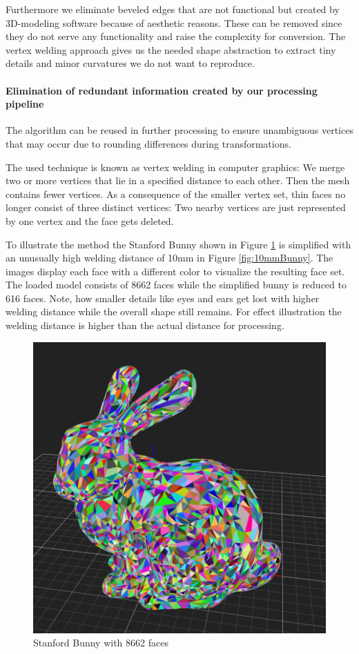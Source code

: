 \documentclass[../ClassicThesis.tex]{subfiles}
\begin{document}
Furthermore we eliminate beveled edges that are not functional but created by 3D-modeling software because of aesthetic reasons. These can be removed since they do not serve any functionality and raise the complexity for conversion. The vertex welding approach gives us the needed shape abstraction to extract tiny details and minor curvatures we do not want to reproduce.

\paragraph*{Elimination of redundant information created by our processing pipeline}

The algorithm can be reused in further processing to ensure unambiguous vertices that may occur due to rounding differences during transformations.


The used technique is known as vertex welding in computer graphics: We merge two or more vertices that lie in a specified distance to each other. Then the mesh contains fewer vertices. As a consequence of the smaller vertex set, thin faces no longer consist of three distinct vertices: Two nearby vertices are just represented by one vertex and the face gets deleted.

To illustrate the method the {\threedmodel} Stanford Bunny shown in Figure \ref{fig:origBunny} is simplified with an unusually high welding distance of 10mm in Figure \ref{fig:10mmBunny}. The images display each face with a different color to visualize the resulting face set. The loaded model consists of 8662 faces while the simplified bunny is reduced to 616 faces. Note, how smaller details like eyes and ears get lost with higher welding distance while the overall shape still remains. For effect illustration the welding distance is higher than the actual distance for processing.

\begin{figure}
\includegraphics[width=0.8\columnwidth]{Images/04-approx-welding-rabbit-original.png}
\caption{Stanford Bunny with 8662 faces}
\label{fig:origBunny}
\end{figure}
\end{document}
